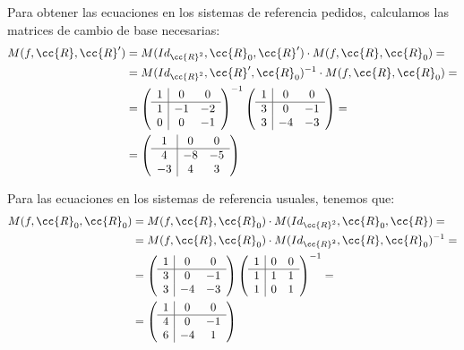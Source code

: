 \begin{ejercicio}
    Para obtener las ecuaciones en los sistemas de referencia pedidos, calculamos las matrices de cambio de base necesarias:
    \begin{equation*}\begin{split}
        M(f,\cc{R},\cc{R}') &= M(Id_{\cc{R}^2}, \cc{R}_0, \cc{R}')\cdot M(f,\cc{R},\cc{R}_0) =\\
        &= M(Id_{\cc{R}^2}, \cc{R}', \cc{R}_0)^{-1}\cdot M(f,\cc{R},\cc{R}_0) =\\
        &= \left(\begin{array}{c|cc}
            1 & 0 & 0 \\ \hline
            1 & -1 & -2\\
            0 & 0 & -1
        \end{array}\right)^{-1}
        \left(\begin{array}{c|cc}
            1 & 0 & 0 \\ \hline
            3 & 0 & -1\\
            3 & -4 & -3
        \end{array}\right) =\\
        &= \left(\begin{array}{c|cc}
            1 & 0 & 0 \\ \hline
            4 & -8 & -5\\
            -3 & 4 & 3
        \end{array}\right)
    \end{split}\end{equation*}

    Para las ecuaciones en los sistemas de referencia usuales, tenemos que:
    \begin{equation*}\begin{split}
        M(f,\cc{R}_0,\cc{R}_0) &=M(f,\cc{R},\cc{R}_0)\cdot  M(Id_{\cc{R}^2}, \cc{R}_0, \cc{R}) =\\
        &= M(f,\cc{R},\cc{R}_0)\cdot  M(Id_{\cc{R}^2}, \cc{R}, \cc{R}_0)^{-1} =\\
        &= \left(\begin{array}{c|cc}
            1 & 0 & 0 \\ \hline
            3 & 0 & -1\\
            3 & -4 & -3
        \end{array}\right)\left(\begin{array}{c|cc}
            1 & 0 & 0 \\ \hline
            1 & 1 & 1\\
            1 & 0 & 1
        \end{array}\right)^{-1}
        =\\
        &= \left(\begin{array}{c|cc}
            1 & 0 & 0 \\ \hline
            4 & 0 & -1\\
            6 & -4 & 1
        \end{array}\right)
    \end{split}\end{equation*}
\end{ejercicio}


